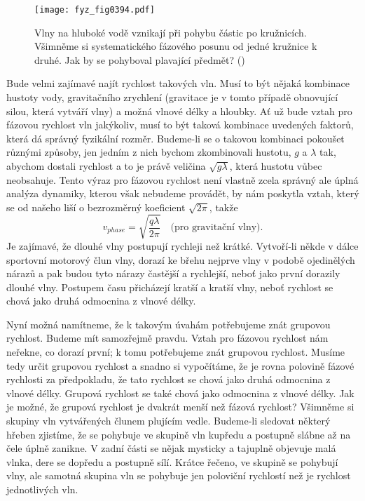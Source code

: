  \begin{figure}[ht!] %
    \centering
    \texttt{[image: fyz\_fig0394.pdf]}
    \caption{Vlny na hluboké vodě vznikají při pohybu částic po kružnicích. Všimněme si 
             systematického fázového posunu od jedné kružnice k druhé. Jak by se pohyboval 
             plavající předmět?
             (\cite[s.~695]{Feynman01})}
    \label{fyz:fig0394}
  \end{figure}

  Bude velmi zajímavé najít rychlost takových vln. Musí to být nějaká kombinace hustoty vody, 
  gravitačního zrychlení (gravitace je v tomto případě obnovující silou, která vytváří vlny) a 
  možná vlnové délky a hloubky. Ať už bude vztah pro fázovou rychlost vln jakýkoliv, musí to být 
  taková kombinace uvedených faktorů, která dá správný fyzikální rozměr. Budeme-li se o takovou 
  kombinaci pokoušet různými způsoby, jen jedním z nich bychom zkombinovali hustotu, \(g\) a 
  \(\lambda\) tak, abychom dostali rychlost a to je právě veličina \(\sqrt{g\lambda}\), která 
  hustotu vůbec neobsahuje. Tento výraz pro fázovou rychlost není vlastně zcela správný ale úplná 
  analýza dynamiky, kterou však nebudeme provádět, by nám poskytla vztah, který se od našeho liší o 
  bezrozměrný koeficient \(\sqrt{2\pi}\), takže
  \begin{equation*}
    v_{phase} = \sqrt{\dfrac{q\lambda}{2\pi}} \quad\text{(pro gravitační vlny)}.
  \end{equation*}
  Je zajímavé, že dlouhé vlny postupují rychleji než krátké. Vytvoří-li někde v dálce sportovní 
  motorový člun vlny, dorazí ke břehu nejprve vlny v podobě ojedinělých nárazů a pak budou tyto 
  nárazy častější a rychlejší, neboť jako první dorazily dlouhé vlny. Postupem času přicházejí 
  kratší a kratší vlny, neboť rychlost se chová jako druhá odmocnina z vlnové délky.
  
  Nyní možná namítneme, že k takovým úvahám potřebujeme znát grupovou rychlost. Budeme mít 
  samozřejmě pravdu. Vztah pro fázovou rychlost nám neřekne, co dorazí první; k tomu potřebujeme 
  znát grupovou rychlost. Musíme tedy určit grupovou rychlost a snadno si vypočítáme, že je rovna 
  polovině fázové rychlosti za předpokladu, že tato rychlost se chová jako druhá odmocnina z vlnové 
  délky. Grupová rychlost se také chová jako odmocnina z vlnové délky. Jak je možné, že grupová 
  rychlost je dvakrát menší než fázová rychlost? Všimněme si skupiny vln vytvářených člunem 
  plujícím vedle. Budeme-li sledovat některý hřeben zjistíme, že se pohybuje ve skupině vln kupředu 
  a postupně slábne až na čele úplně zanikne. V zadní části se nějak mysticky a tajuplně objevuje 
  malá vlnka, dere se dopředu a postupně sílí. Krátce řečeno, ve skupině se pohybují vlny, ale 
  samotná skupina vln se pohybuje jen poloviční rychlostí než je rychlost jednotlivých vln.
  

